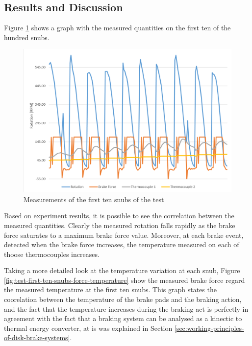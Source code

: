 	\subsection{Results and Discussion}\label{ssec:full-stop-test-results}

		Figure \ref{fig:test-first-ten-snubs} shows a graph with the measured quantities on the first ten of the hundred snubs.

		\begin{figure}[htbp]
				\centering
				\includegraphics[width=.8\textwidth]{figuras/fig-test-first-ten-snubs}
				\caption{Measurements of the first ten snubs of the test}
				\label{fig:test-first-ten-snubs}
		\end{figure}

		Based on experiment results, it is possible to see the correlation between the measured quantities. Clearly the measured rotation falls rapidly as the brake force saturates to a maximum brake force value. Moreover, at each brake event, detected when the brake force increases, the temperature measured on each of thoose thermocouples increases.
		\par

		Taking a more detailed look at the temperature variation at each snub, Figure \ref{fig:test-first-ten-snubs-force-temperature} show the measured brake force regard the measured temperature at the first ten snubs. This graph states the coorelation between the temperature of the brake pads and the braking action, and the fact that the temperature increases during the braking act is perfectly in agreement with the fact that a braking system can be analysed as a kinectic to thermal energy converter, at is was explained in Section \ref{sec:working-principles-of-disk-brake-systems}.

